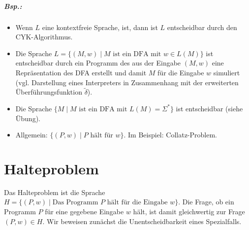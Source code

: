 \subparagraph{Bsp.:}
\begin{itemize}
\item Wenn $L$ eine kontextfreie Sprache, ist, dann ist $L$ entscheidbar durch den CYK-Algorithmus.
\item Die Sprache $L= \{ (M,w) \;|\; M \text{ ist ein DFA mit }w\in L(M)\}$ ist entscheidbar durch ein Programm des aus der Eingabe $(M,w)$ eine Repräsentation des DFA erstellt und damit $M$ für die Eingabe $w$ simuliert (vgl. Darstellung eines Interpreters in Zusammenhang mit der erweiterten Überführungsfunktion $\tilde{\delta}$).
\item Die Sprache $\{ M \;|\; M \text{ ist ein DFA mit }L(M)=\Sigma^*\}$ ist entscheidbar (siehe Übung).
\item Allgemein: $\{(P,w)\;|\;P \text{ hält für }w\}$. Im Beispiel: Collatz-Problem.
\end{itemize}
\section{Halteproblem}
Das Halteproblem ist die Sprache $H=\{ (P,w) \;|\; \text{Das Programm $P$ hält für die Eingabe }w\}$. Die Frage, ob ein Programm $P$ für eine gegebene Eingabe $w$ hält, ist damit gleichwertig zur Frage $(P,w)\in H$. Wir beweisen zunächst die Unentscheidbarkeit eines Spezialfalls.

